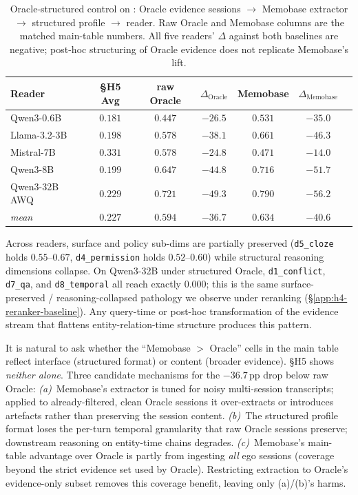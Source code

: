 \begin{table}[h]
\centering
\small
\caption{Oracle-structured control on \benchL: Oracle evidence sessions $\to$ Memobase extractor $\to$ structured profile $\to$ reader. Raw Oracle and Memobase columns are the matched main-table numbers. All five readers' $\Delta$ against both baselines are negative; post-hoc structuring of Oracle evidence does not replicate Memobase's lift.}
\label{tab:h5-oracle-structured}
\begin{tabular}{lcccccc}
\toprule
Reader & \S H5 Avg & raw Oracle & $\Delta_{\text{Oracle}}$ & Memobase & $\Delta_{\text{Memobase}}$ \\
\midrule
Qwen3-0.6B    & $0.181$ & $0.447$ & $-26.5$ & $0.531$ & $-35.0$ \\
Llama-3.2-3B  & $0.198$ & $0.578$ & $-38.1$ & $0.661$ & $-46.3$ \\
Mistral-7B    & $0.331$ & $0.578$ & $-24.8$ & $0.471$ & $-14.0$ \\
Qwen3-8B      & $0.199$ & $0.647$ & $-44.8$ & $0.716$ & $-51.7$ \\
Qwen3-32B AWQ & $0.229$ & $0.721$ & $-49.3$ & $0.790$ & $-56.2$ \\
\midrule
\emph{mean}   & $0.227$ & $0.594$ & $\mathbf{-36.7}$ & $0.634$ & $\mathbf{-40.6}$ \\
\bottomrule
\end{tabular}
\end{table}

Across readers, surface and policy sub-dims are partially preserved (\texttt{d5\_cloze} holds $0.55$--$0.67$, \texttt{d4\_permission} holds $0.52$--$0.60$) while structural reasoning dimensions collapse. On Qwen3-32B under structured Oracle, \texttt{d1\_conflict}, \texttt{d7\_qa}, and \texttt{d8\_temporal} all reach exactly $0.000$; this is the same surface-preserved / reasoning-collapsed pathology we observe under reranking (\S\ref{app:h4-reranker-baseline}). Any query-time or post-hoc transformation of the evidence stream that flattens entity-relation-time structure produces this pattern.

It is natural to ask whether the ``Memobase $>$ Oracle'' cells in the main table reflect interface (structured format) or content (broader evidence). \S H5 shows \emph{neither alone}. Three candidate mechanisms for the $-36.7$\,pp drop below raw Oracle:
\emph{(a)}~Memobase's extractor is tuned for noisy multi-session transcripts; applied to already-filtered, clean Oracle sessions it over-extracts or introduces artefacts rather than preserving the session content.
\emph{(b)}~The structured profile format loses the per-turn temporal granularity that raw Oracle sessions preserve; downstream reasoning on entity-time chains degrades.
\emph{(c)}~Memobase's main-table advantage over Oracle is partly from ingesting \emph{all} ego sessions (coverage beyond the strict evidence set used by Oracle). Restricting extraction to Oracle's evidence-only subset removes this coverage benefit, leaving only (a)/(b)'s harms.

